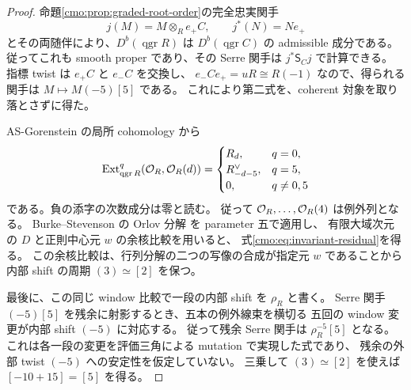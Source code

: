 \begin{proof}
命題\ref{cmo:prop:graded-root-order}の完全忠実関手
\[
 j(M)=M\otimes_R e_+C,\qquad j^*(N)=Ne_+
\]
とその両随伴により、$D^b(\operatorname{qgr}R)$ は
$D^b(\operatorname{qgr}C)$ の admissible 成分である。
従ってこれも smooth proper であり、その Serre 関手は
$j^*\mathsf S_Cj$ で計算できる。
指標 twist は $e_+C$ と $e_-C$ を交換し、
$e_-Ce_+=uR\cong R(-1)$ なので、得られる関手は
$M\mapsto M(-5)[5]$ である。
これにより第二式を、coherent 対象を取り落とさずに得た。

AS-Gorenstein の局所 cohomology から
\[
 \operatorname{Ext}^q_{\operatorname{qgr}R}
       (\mathcal O_R,\mathcal O_R(d))=
 \begin{cases}
 R_d,&q=0,\\
 R_{-d-5}^{\vee},&q=5,\\
 0,&q\ne0,5
 \end{cases}
\]
である。負の添字の次数成分は零と読む。
従って $\mathcal O_R,\ldots,\mathcal O_R(4)$ は例外列となる。
Burke--Stevenson の Orlov 分解
\cite[Theorem~6.4]{LP-BS}を parameter 五で適用し、
有限大域次元の $D$ と正則中心元 $w$ の余核比較を用いると、
式\eqref{cmo:eq:invariant-residual}を得る。
この余核比較は、行列分解の二つの写像の合成が指定元 $w$ であることから
内部 shift の周期 $(3)\simeq[2]$ を保つ。

最後に、この同じ window 比較で一段の内部 shift を $\rho_R$ と書く。
Serre 関手 $(-5)[5]$ を残余に射影するとき、五本の例外線束を横切る
五回の window 変更が内部 shift $(-5)$ に対応する。
従って残余 Serre 関手は $\rho_R^{-5}[5]$ となる。
これは各一段の変更を評価三角による mutation で実現した式であり、
残余の外部 twist $(-5)$ への安定性を仮定していない。
三乗して $(3)\simeq[2]$ を使えば $[-10+15]=[5]$ を得る。
\end{proof}
